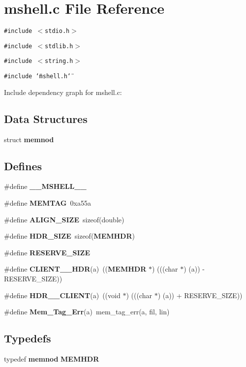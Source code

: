 \section{mshell.c File Reference}
\label{mshell_8c}
{\tt \#include $<$stdio.h$>$}\par
{\tt \#include $<$stdlib.h$>$}\par
{\tt \#include $<$string.h$>$}\par
{\tt \#include \char`\"{}mshell.h\char`\"{}}\par


Include dependency graph for mshell.c:\subsection*{Data Structures}
\begin{CompactItemize}
\item 
struct {\bf memnod}
\end{CompactItemize}
\subsection*{Defines}
\begin{CompactItemize}
\item 
\#define {\bf \_\-\_\-MSHELL\_\-\_\-}
\item 
\#define {\bf MEMTAG}\ 0xa55a
\item 
\#define {\bf ALIGN\_\-SIZE}\ sizeof(double)
\item 
\#define {\bf HDR\_\-SIZE}\ sizeof({\bf MEMHDR})
\item 
\#define {\bf RESERVE\_\-SIZE}
\item 
\#define {\bf CLIENT\_\_\-HDR}(a)\ (({\bf MEMHDR} $\ast$)  (((char $\ast$) (a)) - RESERVE\_\-SIZE))
\item 
\#define {\bf HDR\_\_\-CLIENT}(a)\ ((void $\ast$)  (((char $\ast$) (a)) + RESERVE\_\-SIZE))
\item 
\#define {\bf Mem\_\-Tag\_\-Err}(a)\ mem\_\-tag\_\-err(a, fil, lin)
\end{CompactItemize}
\subsection*{Typedefs}
\begin{CompactItemize}
\item 
typedef {\bf memnod} {\bf MEMHDR}
\end{CompactItemize}
